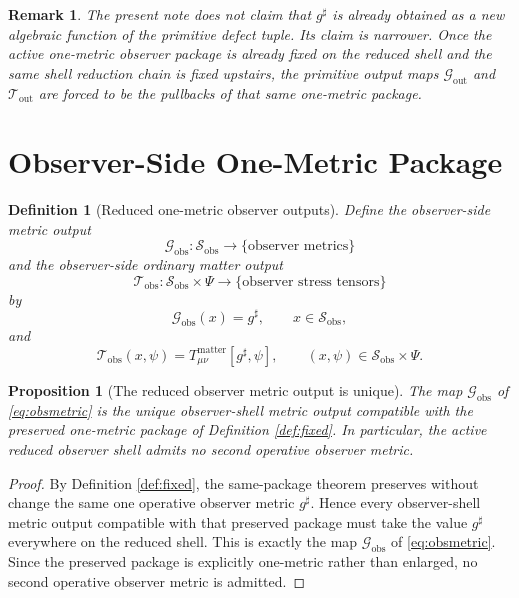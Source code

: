 \documentclass[11pt]{article}
\newcommand{\CompletedMetric}{g^{\sharp}}
\newcommand{\ObsShell}{\mathcal S_{\mathrm{obs}}}
\newcommand{\MetricOut}{\mathscr G_{\mathrm{out}}}
\newcommand{\MatterOut}{\mathscr T_{\mathrm{out}}}
\newcommand{\ObsMetricOut}{\mathscr G_{\mathrm{obs}}}
\newcommand{\ObsMatterOut}{\mathscr T_{\mathrm{obs}}}
\newtheorem{definition}{Definition}
\newtheorem{proposition}{Proposition}
\newtheorem{remark}{Remark}
\begin{document}
\begin{remark}
The present note does not claim that \(\CompletedMetric\) is already obtained as a new algebraic function of the primitive defect tuple. Its claim is narrower. Once the active one-metric observer package is already fixed on the reduced shell and the same shell reduction chain is fixed upstairs, the primitive output maps \(\MetricOut\) and \(\MatterOut\) are forced to be the pullbacks of that same one-metric package.
\end{remark}

\section{Observer-Side One-Metric Package}

\begin{definition}[Reduced one-metric observer outputs]
\label{def:observeroutputs}
Define the observer-side metric output
\[
\ObsMetricOut:\ObsShell\to\{\text{observer metrics}\}
\]
and the observer-side ordinary matter output
\[
\ObsMatterOut:\ObsShell\times\Psi\to\{\text{observer stress tensors}\}
\]
by
\begin{equation}
\ObsMetricOut(x)=\CompletedMetric,
\qquad
x\in\ObsShell,
\label{eq:obsmetric}
\end{equation}
and
\begin{equation}
\ObsMatterOut(x,\psi)
=
T_{\mu\nu}^{\mathrm{matter}}[\CompletedMetric,\psi],
\qquad
(x,\psi)\in\ObsShell\times\Psi.
\label{eq:obsmatter}
\end{equation}
\end{definition}

\begin{proposition}[The reduced observer metric output is unique]
\label{prop:obsmetric}
The map \(\ObsMetricOut\) of \eqref{eq:obsmetric} is the unique observer-shell metric output compatible with the preserved one-metric package of Definition \ref{def:fixed}. In particular, the active reduced observer shell admits no second operative observer metric.
\end{proposition}

\begin{proof}
By Definition \ref{def:fixed}, the same-package theorem preserves without change the same one operative observer metric \(\CompletedMetric\). Hence every observer-shell metric output compatible with that preserved package must take the value \(\CompletedMetric\) everywhere on the reduced shell. This is exactly the map \(\ObsMetricOut\) of \eqref{eq:obsmetric}. Since the preserved package is explicitly one-metric rather than enlarged, no second operative observer metric is admitted.
\end{proof}
\end{document}
